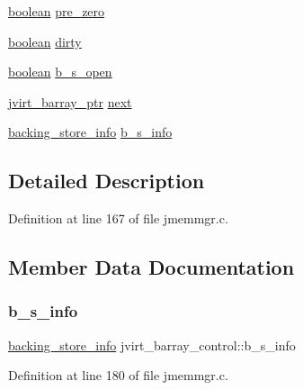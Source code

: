 \begin{DoxyCompactItemize}
\item 
\mbox{\hyperlink{jmorecfg_8h_a7c6368b321bd9acd0149b030bb8275ed}{boolean}} \mbox{\hyperlink{structjvirt__barray__control_a40d3b399333a4d0468c7fcb4465e4cdd}{pre\+\_\+zero}}
\item 
\mbox{\hyperlink{jmorecfg_8h_a7c6368b321bd9acd0149b030bb8275ed}{boolean}} \mbox{\hyperlink{structjvirt__barray__control_a324c033c65e470a10556ba02619c453c}{dirty}}
\item 
\mbox{\hyperlink{jmorecfg_8h_a7c6368b321bd9acd0149b030bb8275ed}{boolean}} \mbox{\hyperlink{structjvirt__barray__control_a5b588561840b293882bcf69e690962b2}{b\+\_\+s\+\_\+open}}
\item 
\mbox{\hyperlink{jpeglib_8h_a994f4cba141d82ded90af38e51223f0b}{jvirt\+\_\+barray\+\_\+ptr}} \mbox{\hyperlink{structjvirt__barray__control_ae4b8dea777dcac10f1de982f0bedac0e}{next}}
\item 
\mbox{\hyperlink{jmemsys_8h_a053e143ffd76dfe3b362c09f7019ea93}{backing\+\_\+store\+\_\+info}} \mbox{\hyperlink{structjvirt__barray__control_a6b33df0220c0545b4d7c7a8563a7fb18}{b\+\_\+s\+\_\+info}}
\end{DoxyCompactItemize}


\subsection{Detailed Description}


Definition at line 167 of file jmemmgr.\+c.



\subsection{Member Data Documentation}
\mbox{\label{structjvirt__barray__control_a6b33df0220c0545b4d7c7a8563a7fb18}} 
\subsubsection{\texorpdfstring{b\_s\_info}{b\_s\_info}}
{\footnotesize\ttfamily \mbox{\hyperlink{jmemsys_8h_a053e143ffd76dfe3b362c09f7019ea93}{backing\+\_\+store\+\_\+info}} jvirt\+\_\+barray\+\_\+control\+::b\+\_\+s\+\_\+info}



Definition at line 180 of file jmemmgr.\+c.

